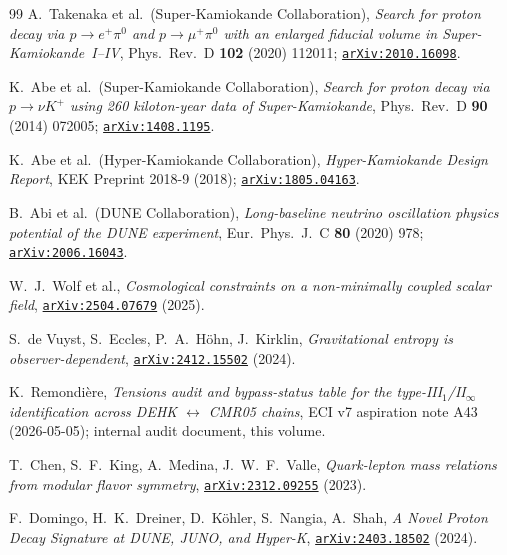 \documentclass[a4paper,11pt]{article}
\newcommand{\arXiv}[1]{\href{https://arxiv.org/abs/#1}{\texttt{arXiv:#1}}}
\theoremstyle{definition}
\theoremstyle{remark}
\begin{document}
\begin{thebibliography}{99}
A.~Takenaka et al.\ (Super-Kamiokande Collaboration),
\emph{Search for proton decay via $p\to e^+\pi^0$ and
$p\to\mu^+\pi^0$ with an enlarged fiducial volume in
Super-Kamiokande~I--IV},
Phys.~Rev.~D \textbf{102} (2020) 112011;
\arXiv{2010.16098}.

K.~Abe et al.\ (Super-Kamiokande Collaboration),
\emph{Search for proton decay via $p\to\nu K^+$ using 260 kiloton-year
data of Super-Kamiokande},
Phys.~Rev.~D \textbf{90} (2014) 072005;
\arXiv{1408.1195}.

K.~Abe et al.\ (Hyper-Kamiokande Collaboration),
\emph{Hyper-Kamiokande Design Report},
KEK Preprint 2018-9 (2018);
\arXiv{1805.04163}.

B.~Abi et al.\ (DUNE Collaboration),
\emph{Long-baseline neutrino oscillation physics potential of the
DUNE experiment},
Eur.~Phys.~J.~C \textbf{80} (2020) 978;
\arXiv{2006.16043}.

W.~J.~Wolf et al.,
\emph{Cosmological constraints on a non-minimally coupled scalar field},
\arXiv{2504.07679} (2025).

S.~de Vuyst, S.~Eccles, P.~A.~H\"ohn, J.~Kirklin,
\emph{Gravitational entropy is observer-dependent},
\arXiv{2412.15502} (2024).

K.~Remondi\`ere,
\emph{Tensions audit and bypass-status table for the
type-III$_1$/II$_\infty$ identification across
DEHK $\leftrightarrow$ CMR05 chains},
ECI v7 aspiration note A43 (2026-05-05);
internal audit document, this volume.

T.~Chen, S.~F.~King, A.~Medina, J.~W.~F.~Valle,
\emph{Quark-lepton mass relations from modular flavor symmetry},
\arXiv{2312.09255} (2023).

F.~Domingo, H.~K.~Dreiner, D.~K\"ohler, S.~Nangia, A.~Shah,
\emph{A Novel Proton Decay Signature at DUNE, JUNO, and Hyper-K},
\arXiv{2403.18502} (2024).


\end{thebibliography}
\end{document}
